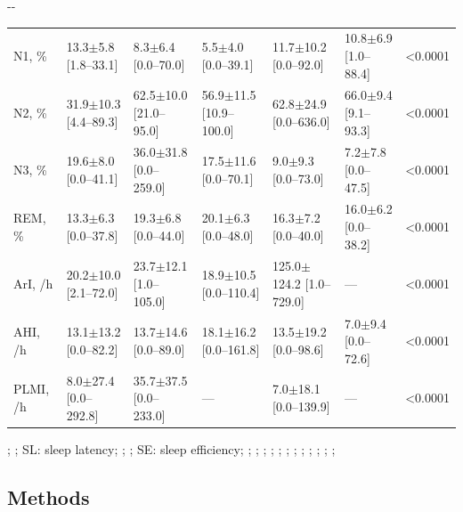 \begin{landscape}
\begin{table}[tb]
\begin{adjustwidth*}{}{-\marginparwidth-\marginparsep}
\begin{threeparttable}
\begin{tabular}{@{}lllllll@{}}
N1, \%     & 13.3$\pm$5.8 {[}1.8--33.1{]}     & 8.3$\pm$6.4 {[}0.0--70.0{]}      & 5.5$\pm$4.0 {[}0.0--39.1{]}      & 11.7$\pm$10.2 {[}0.0--92.0{]}    & 10.8$\pm$6.9 {[}1.0--88.4{]}     & \num{<0.0001}         \\
N2, \%     & 31.9$\pm$10.3 {[}4.4--89.3{]}    & 62.5$\pm$10.0 {[}21.0--95.0{]}   & 56.9$\pm$11.5 {[}10.9--100.0{]}  & 62.8$\pm$24.9 {[}0.0--636.0{]}   & 66.0$\pm$9.4 {[}9.1--93.3{]}     & \num{<0.0001}         \\
N3, \%     & 19.6$\pm$8.0 {[}0.0--41.1{]}     & 36.0$\pm$31.8 {[}0.0--259.0{]}   & 17.5$\pm$11.6 {[}0.0--70.1{]}    & 9.0$\pm$9.3 {[}0.0--73.0{]}      & 7.2$\pm$7.8 {[}0.0--47.5{]}      & \num{<0.0001}         \\
REM, \%    & 13.3$\pm$6.3 {[}0.0--37.8{]}     & 19.3$\pm$6.8 {[}0.0--44.0{]}     & 20.1$\pm$6.3 {[}0.0--48.0{]}     & 16.3$\pm$7.2 {[}0.0--40.0{]}     & 16.0$\pm$6.2 {[}0.0--38.2{]}     & \num{<0.0001} \\
ArI, /h    & 20.2$\pm$10.0 {[}2.1--72.0{]}    & 23.7$\pm$12.1 {[}1.0--105.0{]}   & 18.9$\pm$10.5 {[}0.0--110.4{]}   & 125.0$\pm$124.2 {[}1.0--729.0{]} & ---       & \num{<0.0001}         \\
AHI, /h    & 13.1$\pm$13.2 {[}0.0--82.2{]}    & 13.7$\pm$14.6 {[}0.0--89.0{]}    & 18.1$\pm$16.2 {[}0.0--161.8{]}   & 13.5$\pm$19.2 {[}0.0--98.6{]}    & 7.0$\pm$9.4 {[}0.0--72.6{]}      & \num{<0.0001}         \\
PLMI, /h   & 8.0$\pm$27.4 {[}0.0--292.8{]}    & 35.7$\pm$37.5 {[}0.0--233.0{]}   & ---       & 7.0$\pm$18.1 {[}0.0--139.9{]}    & ---       & \num{<0.0001} \\ \bottomrule
\end{tabular}
\begin{tablenotes}
\item %
; %
; %
SL: sleep latency; %
; %
; %
SE: sleep efficiency; %
; %
; %
; %
; %
; %
; %
; %
; %
; %
; %
; %
; %
\end{tablenotes}
\end{threeparttable}
\end{adjustwidth*}
\end{table}
\end{landscape}

\subsection{Methods}

